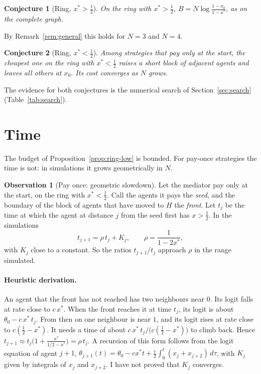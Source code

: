 \documentclass[11pt,a4paper]{article}
\theoremstyle{definition}
\newtheorem{observation}{Observation}
\theoremstyle{plain}
\newtheorem{conjecture}{Conjecture}
\newcommand{\Binf}{B}
\newcommand{\xs}{x^{*}}
\begin{document}
\begin{conjecture}[Ring, $\xs>\tfrac12$]\label{conj:ring-sym}
On the ring with $\xs>\tfrac12$, $\Binf=N\log\frac{1-x_0}{1-\xs}$, as on the complete graph.
\end{conjecture}
By Remark~\ref{rem:general} this holds for $N=3$ and $N=4$.

\begin{conjecture}[Ring, $\xs<\tfrac12$]\label{conj:seed}
Among strategies that pay only at the start, the cheapest one on the ring with $\xs<\tfrac12$ raises a short block of adjacent agents and leaves all others at $x_0$. Its cost converges as $N$ grows.
\end{conjecture}
The evidence for both conjectures is the numerical search of Section~\ref{sec:search} (Table~\ref{tab:search}).

\section{Time}\label{sec:time}

The budget of Proposition~\ref{prop:ring-low} is bounded. For pay-once strategies the time is not: in simulations it grows geometrically in $N$.

\begin{observation}[Pay once: geometric slowdown]\label{obs:front}
Let the mediator pay only at the start, on the ring with $\xs<\tfrac12$. Call the agents it pays the \emph{seed}, and the boundary of the block of agents that have moved to $H$ the \emph{front}. Let $t_j$ be the time at which the agent at distance $j$ from the seed first has $x>\tfrac12$. In the simulations
\[
t_{j+1}=\rho\,t_j+K_j,\qquad\rho=\frac{1}{1-2\xs},
\]
with $K_j$ close to a constant. So the ratios $t_{j+1}/t_j$ approach $\rho$ in the range simulated.
\end{observation}

\paragraph{Heuristic derivation.}
An agent that the front has not reached has two neighbours near $0$. Its logit falls at rate close to $c\,\xs$. When the front reaches it at time $t_j$, its logit is about $\theta_0-c\,\xs\,t_j$. From then on one neighbour is near $1$, and its logit rises at rate close to $c(\tfrac12-\xs)$. It needs a time of about $c\,\xs\,t_j/\bigl(c(\tfrac12-\xs)\bigr)$ to climb back. Hence $t_{j+1}\approx t_j\bigl(1+\frac{\xs}{1/2-\xs}\bigr)=\rho\,t_j$. A recursion of this form follows from the logit equation of agent $j+1$, $\theta_{j+1}(t)=\theta_0-c\xs t+\frac c2\int_0^t(x_j+x_{j+2})\,d\tau$, with $K_j$ given by integrals of $x_j$ and $x_{j+2}$. I have not proved that $K_j$ converges.
\end{document}
